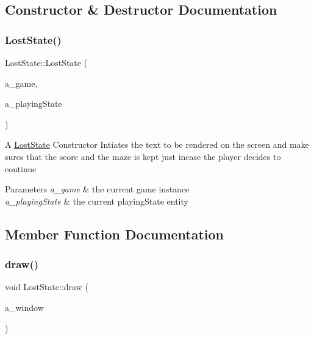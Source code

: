 \subsection{Constructor \& Destructor Documentation}
\mbox{\label{class_lost_state_a92bfadd289d793b53b4395510d35f052}} 
\subsubsection{\texorpdfstring{Lost\+State()}{LostState()}}
{\footnotesize\ttfamily Lost\+State\+::\+Lost\+State (\begin{DoxyParamCaption}\item[{\hyperlink{class_game}{Game} $\ast$}]{a\+\_\+game,  }\item[{\hyperlink{class_game_state}{Game\+State} $\ast$}]{a\+\_\+playing\+State }\end{DoxyParamCaption})}

A \hyperlink{class_lost_state}{Lost\+State} Constructor Intiates the text to be rendered on the screen and make sures that the score and the maze is kept just incase the player decides to continue 
\begin{DoxyParams}{Parameters}
{\em a\+\_\+game} & the current game instance \\
\hline
{\em a\+\_\+playing\+State} & the current playing\+State entity \\
\hline
\end{DoxyParams}


\subsection{Member Function Documentation}
\mbox{\label{class_lost_state_acfdefa77d7ed756a1052d39ed2de8786}} 
\subsubsection{\texorpdfstring{draw()}{draw()}}
{\footnotesize\ttfamily void Lost\+State\+::draw (\begin{DoxyParamCaption}\item[{sf\+::\+Render\+Window \&}]{a\+\_\+window }\end{DoxyParamCaption})\hspace{0.3cm}{\ttfamily [virtual]}}

